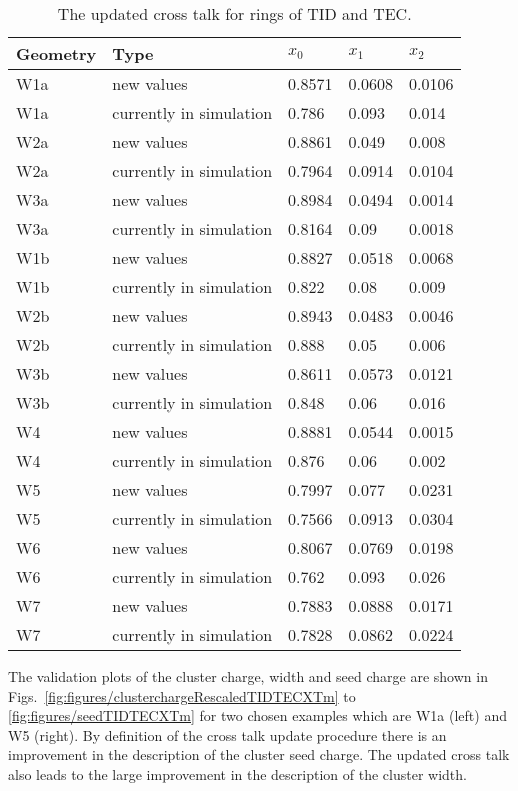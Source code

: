 \begin{table}[h]
\begin{center}
\begin{tabular}{|l|l|l|l|l|}
\hline
Geometry & Type & $x_{0}$ & $x_{1}$ & $x_{2}$ \\
\hline
\hline
W1a &  new values & 0.8571 & 0.0608 & 0.0106 \\
W1a &  currently in simulation & 0.786 & 0.093 & 0.014 \\
\hline
W2a &  new values & 0.8861 & 0.049 & 0.008 \\
W2a &  currently in simulation & 0.7964 & 0.0914 & 0.0104 \\
\hline
W3a &  new values & 0.8984 & 0.0494 & 0.0014 \\
W3a &  currently in simulation & 0.8164 & 0.09 & 0.0018 \\
\hline
W1b &  new values & 0.8827 & 0.0518 & 0.0068 \\
W1b &  currently in simulation & 0.822 & 0.08 & 0.009 \\
\hline
W2b &  new values & 0.8943 & 0.0483 & 0.0046 \\
W2b &  currently in simulation & 0.888 & 0.05 & 0.006 \\
\hline
W3b &  new values & 0.8611 & 0.0573 & 0.0121 \\
W3b &  currently in simulation & 0.848 & 0.06 & 0.016 \\
\hline
W4 &  new values & 0.8881 & 0.0544 & 0.0015 \\
W4 &  currently in simulation & 0.876 & 0.06 & 0.002 \\
\hline
W5 &  new values & 0.7997 & 0.077 & 0.0231 \\
W5 &  currently in simulation & 0.7566 & 0.0913 & 0.0304 \\
\hline
W6 &  new values & 0.8067 & 0.0769 & 0.0198 \\
W6 &  currently in simulation & 0.762 & 0.093 & 0.026 \\
\hline
W7 &  new values & 0.7883 & 0.0888 & 0.0171 \\
W7 &  currently in simulation & 0.7828 & 0.0862 & 0.0224 \\
\hline
\end{tabular}
\caption[Table caption text]{The updated cross talk for rings of TID and TEC. }
\label{tab:measuredXtalkTODTEC}
\end{center}
\end{table}


The validation plots of the cluster charge, width and seed charge are shown in Figs.~\ref{fig:figures/clusterchargeRescaledTIDTECXTm} to \ref{fig:figures/seedTIDTECXTm} for two chosen examples which are W1a (left) and W5 (right). By definition of the cross talk update procedure there is an improvement in the description of the cluster seed charge. The updated cross talk also leads to the large improvement in the description of the cluster width.

